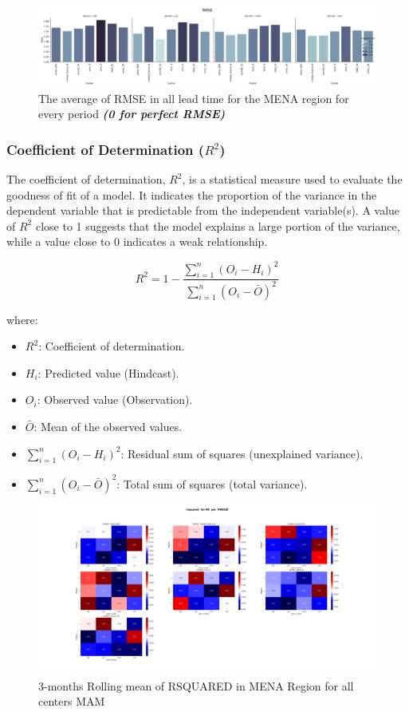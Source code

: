 \begin{figure}[H]
\includegraphics[scale=0.3]{rmse.png}
\caption{The average of RMSE in all lead time for the MENA region for every period \textbf{\textit{(0 for perfect RMSE)} }}
\end{figure}






\subsubsection{Coefficient of Determination (\( R^2 \))}

The coefficient of determination, \( R^2 \), is a statistical measure used to evaluate the goodness of fit of a model. It indicates the proportion of the variance in the dependent variable that is predictable from the independent variable(s). A value of \( R^2 \) close to 1 suggests that the model explains a large portion of the variance, while a value close to 0 indicates a weak relationship.

\[
R^2 = 1 - \frac{\sum_{i=1}^n (O_i - H_i)^2}{\sum_{i=1}^n (O_i - \bar{O})^2}
\]

where:

\begin{itemize}
	\item \( R^2 \): Coefficient of determination.
	\item \( H_i \): Predicted value (Hindcast).
	\item \( O_i \): Observed value (Observation).
	\item \( \bar{O} \): Mean of the observed values.
	\item \( \sum_{i=1}^n (O_i - H_i)^2 \): Residual sum of squares (unexplained variance).
	\item \( \sum_{i=1}^n (O_i - \bar{O})^2 \): Total sum of squares (total variance).
\end{itemize}

\begin{figure}[H]
\includegraphics[scale=0.3]{rsquared_RR_PERIOD.png}
\caption{3-months Rolling mean of RSQUARED in MENA Region for all centers MAM}
\end{figure}

